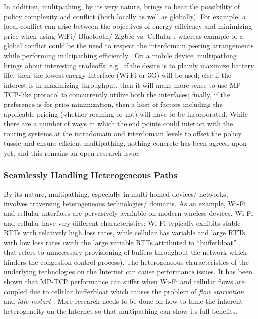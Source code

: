 \documentclass[10pt]{IEEEtran}
\begin{document}
In addition, mulitpathing, by its very nature, brings to bear the possibility of policy complexity and conflict (both locally as well as globally). For example, a local conflict can arise between the objectives of energy efficiency and minimizing price when using WiFi/ Bluetooth/ Zigbee vs. Cellular \cite{vallina2013energy}; whereas example of a global conflict could be the need to respect the interdomain peering arrangements while performing multipathing efficiently \cite{xu2006miro}. On a mobile device, multipathing brings about interesting tradeoffs: e.g., if the desire is to plainly maximize battery life, then the lowest-energy interface (Wi-Fi or 3G) will be used; else if the interest is in maximizing throughput, then it will make more sense to use MP-TCP-like protocol to concurrently utilize both the interfaces; finally, if the preference is for price minimization, then a host of factors including the applicable pricing (whether roaming or not) will have to be incorporated. While there are a number of ways in which the end points could interact with the routing systems at the intradomain and interdomain levels to offset the policy tussle and ensure efficient multipathing, nothing concrete has been agreed upon yet, and this remains an open research issue.

\vspace{2mm}
\subsubsection{Seamlessly Handling Heterogeneous Paths}

By its nature, multipathing, especially in multi-homed devices/ networks, involves traversing heterogeneous technologies/ domains. As an example, Wi-Fi and cellular interfaces are pervasively available on modern wireless devices. Wi-Fi and cellular have very different characteristics: Wi-Fi typically exhibits stable RTTs with relatively high loss rates, while cellular has variable and large RTTs with low loss rates (with the large variable RTTs attributed to ``bufferbloat'' \cite{gettys2011bufferbloat}, \cite{jiang2012understanding} that refers to unnecessary provisioning of buffers throughout the network which hinders the congestion control process). The heterogeneous characteristics of the underlying technologies on the Internet can cause performance issues. It has been shown that MP-TCP performance can suffer when Wi-Fi and cellular flows are coupled due to cellular bufferbloat which causes the problem of \textit{flow starvation} and \textit{idle restart} \cite{chenbufferbloat}. More research needs to be done on how to tame the inherent heterogeneity on the Internet so that multipathing can show its full benefits. 
\end{document}

